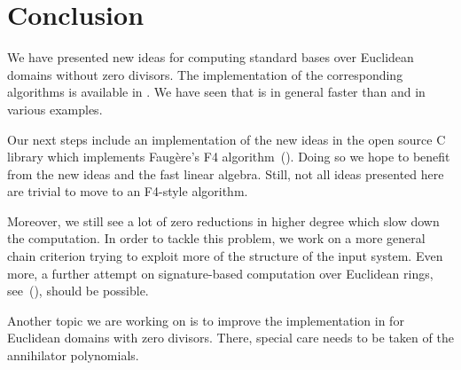 \section{Conclusion}
We have presented new ideas for computing standard bases over Euclidean domains
without zero divisors.
The implementation of the corresponding algorithms is available in \singular. We
have seen that \singular is in general faster than \macaulay and \magma in
various examples.

Our next steps include an implementation of the new ideas in the open source C library
\gbl which implements Faug\`ere's F4 algorithm~(\cite{gbl}). Doing so we hope to
benefit from the new ideas and the fast linear algebra. Still, not all ideas
presented here are trivial to move to an F4-style algorithm.

Moreover, we still see a lot of zero reductions in higher degree which slow down
the computation. In order to tackle this problem, we work on a more general chain
criterion trying to exploit more of the structure of the input system. Even
more, a further attempt on signature-based computation over Euclidean rings,
see~(\cite{eppSigZ2017}), should be possible.

Another topic we are working on is to improve the implementation in \singular
for Euclidean domains with zero divisors. There, special care needs to be
taken of the annihilator polynomials.
